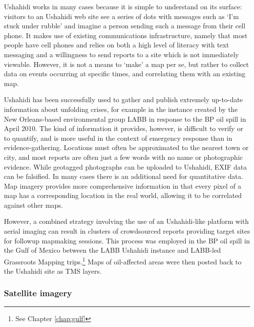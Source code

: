 \documentclass[11pt,oneside,notitlepage]{report}
\begin{document}

Ushahidi works in many cases because it is simple to understand on its surface: visitors to an Ushahidi web site see a series of dots with messages such as `I'm stuck under rubble' and imagine a person sending such a message from their cell phone. It makes use of existing communications infrastructure, namely that most people have cell phones and relies on both a high level of literacy with text messaging and a willingness to send reports to a site which is not immediately viewable. However, it is not a means to `make' a map per se, but rather to collect data on events occurring at specific times, and correlating them with an existing map.

Ushahidi has been successfully used to gather and publish extremely up-to-date information about unfolding crises, for example in the instance created by the New Orleans-based environmental group \ac{LABB} in response to the BP oil spill in April 2010. The kind of information it provides, however, is difficult to verify or to quantify, and is more useful in the context of emergency response than in evidence-gathering. \cite{meier2010verification} Locations must often be approximated to the nearest town or city, and most reports are often just a few words with no name or photographic evidence. While geotagged photographs can be uploaded to Ushahidi, EXIF data can be falsified. In many cases there is an additional need for quantitative data. Map imagery provides more comprehensive information in that every pixel of a map has a corresponding location in the real world, allowing it to be correlated against other maps. 

However, a combined strategy involving the use of an Ushahidi-like platform with aerial imaging can result in clusters of crowdsourced reports providing target sites for followup mapmaking sessions. This process was employed in the BP oil spill in the Gulf of Mexico between the \ac{LABB} Ushahidi instance and \ac{LABB}-led Grassroots Mapping trips.\footnote{See Chapter \ref{chap:gulf}} Maps of oil-affected areas were then posted back to the Ushahidi site as \ac{TMS} layers.


\subsubsection{Satellite imagery}
\label{subsec:satelliterelease}
\end{document}
